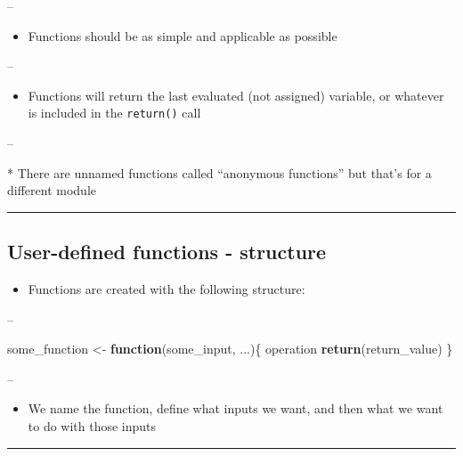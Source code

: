\documentclass[]{article}
\newenvironment{Shaded}{\begin{snugshade}}{\end{snugshade}}
\newcommand{\ControlFlowTok}[1]{\textcolor[rgb]{0.13,0.29,0.53}{\textbf{#1}}}
\newcommand{\KeywordTok}[1]{\textcolor[rgb]{0.13,0.29,0.53}{\textbf{#1}}}
\newcommand{\NormalTok}[1]{#1}
\newcommand{\StringTok}[1]{\textcolor[rgb]{0.31,0.60,0.02}{#1}}
\providecommand{\tightlist}{%
  \setlength{\itemsep}{0pt}\setlength{\parskip}{0pt}}
\begin{document}
--

\begin{itemize}
\tightlist
\item
  Functions should be as simple and applicable as possible
\end{itemize}

--

\begin{itemize}
\tightlist
\item
  Functions will return the last evaluated (not assigned) variable, or
  whatever is included in the \texttt{return()} call
\end{itemize}

--

* There are unnamed functions called ``anonymous functions'' but that's
for a different module

\begin{center}\rule{0.5\linewidth}{\linethickness}\end{center}

\hypertarget{user-defined-functions---structure}{%
\subsection{User-defined functions -
structure}\label{user-defined-functions---structure}}

\begin{itemize}
\tightlist
\item
  Functions are created with the following structure:
\end{itemize}

--

\begin{Shaded}
\begin{Highlighting}[]
\NormalTok{some_function <-}\StringTok{ }\ControlFlowTok{function}\NormalTok{(some_input, ...)\{}
\NormalTok{  operation}
  \KeywordTok{return}\NormalTok{(return_value)}
\NormalTok{\}}
\end{Highlighting}
\end{Shaded}

--

\begin{itemize}
\tightlist
\item
  We name the function, define what inputs we want, and then what we
  want to do with those inputs
\end{itemize}

\begin{center}\rule{0.5\linewidth}{\linethickness}\end{center}
\end{document}
